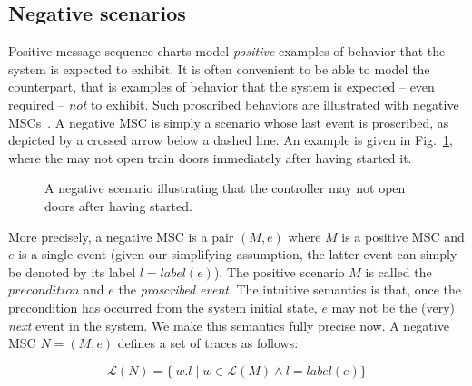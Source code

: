 \subsection{Negative scenarios}

Positive message sequence charts model \emph{positive} examples of behavior that the system is expected to exhibit. It is often convenient to be able to model the counterpart, that is examples of behavior that the system is expected -- even required -- \emph{not} to exhibit. Such proscribed behaviors are illustrated with negative MSCs~\cite{Uchitel:2004}. A negative MSC is simply a scenario whose last event is proscribed, as depicted by a crossed arrow below a dashed line. An example is given in Fig.~\ref{image:train-negative-scenario}, where the  may not open train doors immediately after having started it.

\vspace{0.4cm}
\begin{figure}[H]\centering
{}
\caption{A negative scenario illustrating that the controller may not open doors after having started.\label{image:train-negative-scenario}}
\end{figure}

More precisely, a negative MSC is a pair $(M,e)$ where $M$ is a positive MSC and $e$ is a single event (given our simplifying assumption, the latter event can simply be denoted by its label $l = label(e)$). The positive scenario $M$ is called the $precondition$ and $e$ the \emph{proscribed event}. The intuitive semantics is that, once the precondition has occurred from the system initial state, $e$ may not be the (very) \emph{next} event in the system. We make this semantics fully precise now. A negative MSC $N = (M,e)$ defines a set of traces as follows:

\begin{equation*}
\mathcal{L}(N) = \{~w.l \mid w \in \mathcal{L}(M) \wedge l = label(e) \}
\end{equation*}

